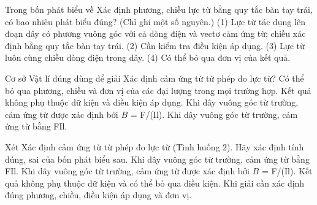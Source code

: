 \begin{ex}
Trong bốn phát biểu về Xác định phương, chiều lực từ bằng quy tắc bàn tay trái, có bao nhiêu phát biểu đúng? (Chỉ ghi một số nguyên.) (1) Lực từ tác dụng lên đoạn dây có phương vuông góc với cả dòng điện và vectơ cảm ứng từ; chiều xác định bằng quy tắc bàn tay trái. (2) Cần kiểm tra điều kiện áp dụng. (3) Lực từ luôn cùng chiều dòng điện trong dây. (4) Có thể bỏ qua đơn vị của kết quả.
\end{ex}

\begin{ex}
Cơ sở Vật lí đúng dùng để giải Xác định cảm ứng từ từ phép đo lực từ?
\choice
{Có thể bỏ qua phương, chiều và đơn vị của các đại lượng trong mọi trường hợp.}
{Kết quả không phụ thuộc dữ kiện và điều kiện áp dụng.}
{\True Khi dây vuông góc từ trường, cảm ứng từ được xác định bởi $B$ = F/(Il).}
{Khi dây vuông góc từ trường, cảm ứng từ bằng FIl.}
\end{ex}

\begin{ex}
Xét Xác định cảm ứng từ từ phép đo lực từ (Tình huống 2). Hãy xác định tính đúng, sai của bốn phát biểu sau.
\choiceTF
{Khi dây vuông góc từ trường, cảm ứng từ bằng FIl.}
{\True Khi dây vuông góc từ trường, cảm ứng từ được xác định bởi $B$ = F/(Il).}
{Kết quả không phụ thuộc dữ kiện và có thể bỏ qua điều kiện.}
{\True Khi giải cần xác định đúng phương, chiều, điều kiện áp dụng và đơn vị.}
\end{ex}

